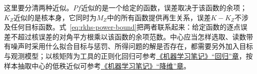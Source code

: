 这里要分清两种近似。$Pf$近似的是一个给定的函数，误差取决于该函数的余项；$K_Z$近似的是核本身，它同时为$M_Z$中的所有函数提供再生关系，误差$K-K_Z$不涉及任何目标函数。式~\eqref{eq:rkhs-power-bound}把两者联系起来：给定函数的逐点误差不超过核误差的对角平方根乘以该函数的余项范数。中心应当怎样选取、读数带有噪声时采用什么拟合目标与惩罚、所得问题的解是否存在，都需要另外加入目标与观测模型；以核矩阵为工具的正则化回归可参考\href{https://github.com/shixiaogang/notes-on-machine-learning/blob/ff88d50e0edf94a815bc6e16e76ded414f406dc2/tex/07-classic-models/02-regression.tex}{《机器学习笔记》“回归”章}，按样本抽取中心的低秩近似可参考\href{https://github.com/shixiaogang/notes-on-machine-learning/blob/ff88d50e0edf94a815bc6e16e76ded414f406dc2/tex/07-classic-models/05-dimensionality-reduction.tex}{《机器学习笔记》“降维”章}。
